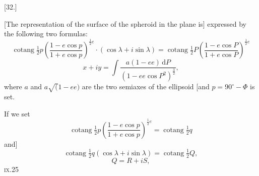 \begin{center}[32.]\end{center}

[The representation of the surface of the spheroid in the plane is] expressed by the following two formulas:
\begin{equation*}
\operatorname{cotang}\tfrac12 p\left(\frac{1-e\cos p}{1+e\cos p}\right)^{\frac12 e}
\cdot(\cos\lambda+i\sin\lambda)
=\operatorname{cotang}\tfrac12 P\left(\frac{1-e\cos P}{1+e\cos P}\right)^{\frac12 e}
\tag*{1)}
\end{equation*}
\begin{equation*}
x+iy=\int\frac{a(1-ee)\,\mathrm dP}{(1-ee\cos P^2)^{\frac32}},
\tag*{2)}
\end{equation*}
\noindent where \(a\) and \(a\surd(1-ee)\) are the two semiaxes of the ellipsoid
[and \(p=90^\circ-\Phi\) is set.

If we set
\[
\operatorname{cotang}\tfrac12 p\left(\frac{1-e\cos p}{1+e\cos p}\right)^{\frac12 e}
=\operatorname{cotang}\tfrac12 q
\]
\noindent and]
\[
\operatorname{cotang}\tfrac12 q(\cos\lambda+i\sin\lambda)=\operatorname{cotang}\tfrac12 Q,
\]
\noindent [as well as]
\[
Q=R+iS,
\]
\noindent\textsc{ix.}\hfill 25\hspace*{.12\linewidth}\par

\par\clearpage
\noindent{}\makebox[12mm][r]{}\par\medskip


